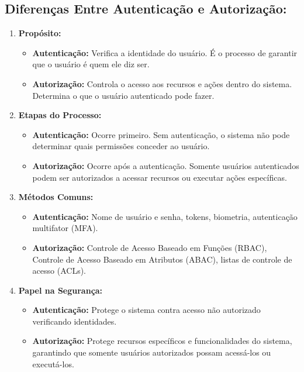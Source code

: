 \documentclass{scrartcl}
\begin{document}
\subsection{Diferenças Entre Autenticação e Autorização:}
\label{sec:orgf54cfc7}

\begin{enumerate}
\item \textbf{\textbf{Propósito:}}
\begin{itemize}
\item \textbf{\textbf{Autenticação:}} Verifica a identidade do usuário. É o processo de garantir que o usuário é quem ele diz ser.
\item \textbf{\textbf{Autorização:}} Controla o acesso aos recursos e ações dentro do sistema. Determina o que o usuário autenticado pode fazer.
\end{itemize}

\item \textbf{\textbf{Etapas do Processo:}}
\begin{itemize}
\item \textbf{\textbf{Autenticação:}} Ocorre primeiro. Sem autenticação, o sistema não pode determinar quais permissões conceder ao usuário.
\item \textbf{\textbf{Autorização:}} Ocorre após a autenticação. Somente usuários autenticados podem ser autorizados a acessar recursos ou executar ações específicas.
\end{itemize}

\item \textbf{\textbf{Métodos Comuns:}}
\begin{itemize}
\item \textbf{\textbf{Autenticação:}} Nome de usuário e senha, tokens, biometria, autenticação multifator (MFA).
\item \textbf{\textbf{Autorização:}} Controle de Acesso Baseado em Funções (RBAC), Controle de Acesso Baseado em Atributos (ABAC), listas de controle de acesso (ACLs).
\end{itemize}

\item \textbf{\textbf{Papel na Segurança:}}
\begin{itemize}
\item \textbf{\textbf{Autenticação:}} Protege o sistema contra acesso não autorizado verificando identidades.
\item \textbf{\textbf{Autorização:}} Protege recursos específicos e funcionalidades do sistema, garantindo que somente usuários autorizados possam acessá-los ou executá-los.
\end{itemize}
\end{enumerate}
\end{document}
